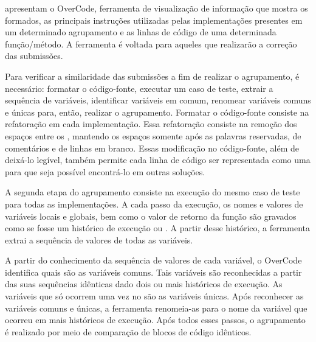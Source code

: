 	     apresentam o OverCode, ferramenta de visualização
	    de informação que mostra os  formados, as principais
	    instruções utilizadas pelas implementações presentes em um determinado
	    agrupamento e as linhas de código de uma determinada função/método. A
	    ferramenta é voltada para aqueles que realizarão a correção das submissões.
	    
	    Para verificar a similaridade das submissões a fim de realizar o agrupamento,
	    é necessário: formatar o código-fonte, executar um caso de teste, extrair a sequência
	    de variáveis, identificar variáveis em comum, renomear variáveis comuns e únicas
	    para, então, realizar o agrupamento. Formatar o código-fonte consiste na refatoração
	    em cada implementação. Essa refatoração consiste na remoção dos espaços entre os
	    , mantendo os espaços somente após as palavras reservadas, de
	    comentários e de linhas em branco. Essas modificação no código-fonte, além de
	    deixá-lo legível, também permite cada linha de código ser representada como
	    uma  para que seja possível encontrá-lo em outras soluções.
	    
	    A segunda etapa do agrupamento consiste na execução do mesmo caso de teste
	    para todas as implementações. A cada passo da execução, os nomes e valores de
	    variáveis locais e globais, bem como o valor de retorno da função são gravados
	    como se fosse um histórico de execução ou . A partir desse
	    histórico, a ferramenta extrai a sequência de valores de todas as variáveis.
	    
	    A partir do conhecimento da sequência de valores de cada variável, o OverCode
	    identifica quais são as variáveis comuns. Tais variáveis são reconhecidas a
	    partir das suas sequências idênticas dado dois ou mais históricos de execução.
	    As variáveis que só ocorrem uma vez no  são as variáveis únicas.
	    Após reconhecer as variáveis comuns e únicas, a ferramenta renomeia-as para o
	    nome da variável que ocorreu em mais históricos de execução. Após todos esses
	    passos, o agrupamento é realizado por meio de comparação de blocos de código
	    idênticos.
	    
